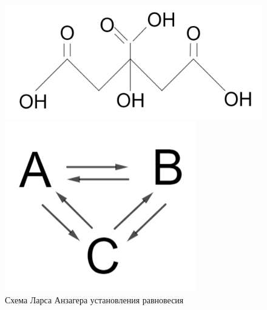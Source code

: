 \begin{lecture}
\begin{lecSection}
\begin{figure}[H]
	\begin{minipage}[h]{0.26\linewidth}
		\centering\includegraphics[width=\linewidth]{lecture_05/pic1}
			\caption{$pK_A = 3,13$}
	\end{minipage}
	\hfill
	\begin{minipage}[h]{0.30\linewidth}
		\centering\includegraphics[width=\linewidth]{lecture_05/pic2}
			\caption{Схема Ларса Анзагера установления равновесия}
	\end{minipage}
	\hfill
	\begin{minipage}[h]{0.28\linewidth}

\end{minipage}
\end{figure}
\end{lecSection}
\end{lecture}
